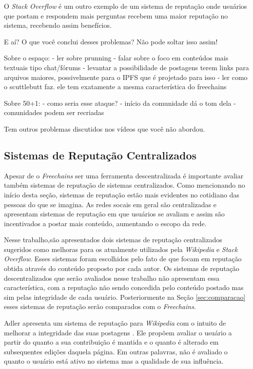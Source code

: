 \documentclass[12pt]{article}
\newcommand{\FC} {\emph{Freechains}\xspace}
\begin{document}
O \emph{Stack Overflow} é um outro exemplo de um sistema de reputação onde usuários que postam e respondem mais perguntas recebem uma maior reputação no sistema, recebendo assim benefícios.

E aí? O que você conclui desses problemas? Não pode soltar isso assim!

Sobre o espaço:
    - ler sobre prunning
    - falar sobre o foco em conteúdos mais textuais tipo chat/fórums
    - levantar a possibilidade de postagens terem links para arquivos maiores, possivelmente para o IPFS que é projetado para isso
    - ler como o scuttlebutt faz. ele tem exatamente a mesma característica do freechains

Sobre 50+1:
    - como seria esse ataque?
    - início da comunidade dá o tom dela
    - comunidades podem ser recriadas

Tem outros problemas discutidos nos vídeos que você não abordou.

\subsection{Sistemas de Reputação Centralizados} \label{subsec:SRCentra}

Apesar de o \FC ser uma ferramenta descentralizada é importante avaliar também sistemas de reputação de sistemas centralizados. Como mencionando no início desta seção, sistemas de reputação estão mais evidentes no cotidiano das pessoas do que se imagina. As redes socais em geral são centralizadas e apresentam sistemas de reputação em que usuários se avaliam e assim são incentivados a postar mais conteúdo, aumentando o escopo da rede.

Nesse trabalho,são apresentados dois sistemas de reputação centralizados sugeridos como melhoras para os atualmente utilizados pela \emph{Wikipedia} e \emph{Stack Overflow}. Esses sistemas foram escolhidos pelo fato de que focam em reputação obtida através do conteúdo proposto por cada autor. Os sistemas de reputação descentralizados que serão avaliados nesse trabalho não apresentam essa característica, com a reputação não sendo concedida pelo conteúdo postado mas sim pelas integridade de cada usuário. Posteriormente na Seção \ref{sec:comparacao} esses sistemas de reputação serão comparados com o \FC. 

Adler apresenta um sistema de reputação para \emph{Wikipedia} com o intuito de melhorar a integridade das suas postagens \cite{adler2007content}. Ele propõem avaliar o usuário a partir do quanto a sua contribuição é mantida e o quanto é alterado em subsequentes edições daquela página. Em outras palavras, não é avaliado o quanto o usuário está ativo no sistema mas a qualidade de sua influência. 
\end{document}
